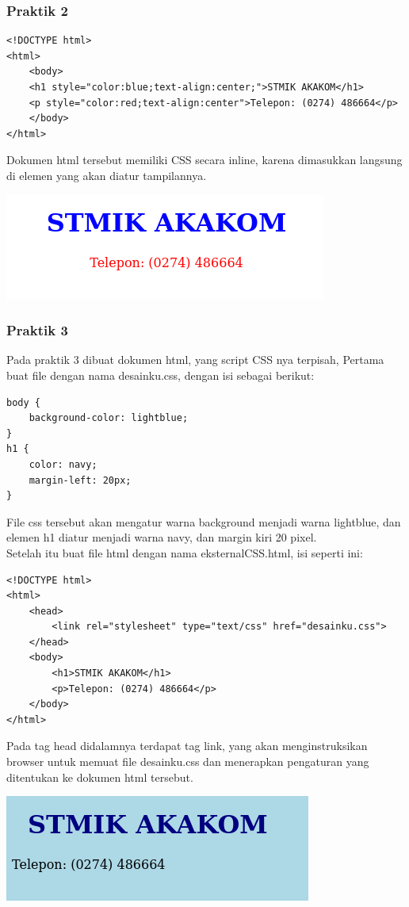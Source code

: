 \documentclass[a4paper,12pt]{article}
\begin{document}
\subsubsection{Praktik 2}
\begin{lstlisting}
<!DOCTYPE html>
<html>
    <body>
    <h1 style="color:blue;text-align:center;">STMIK AKAKOM</h1>
    <p style="color:red;text-align:center">Telepon: (0274) 486664</p>
    </body>
</html>
\end{lstlisting}

Dokumen html tersebut memiliki CSS secara inline, karena dimasukkan langsung di elemen yang
akan diatur tampilannya.
\begin{center}
    \includegraphics[width=\linewidth]{2.png}
\end{center}

\subsubsection{Praktik 3}
Pada praktik 3 dibuat dokumen html, yang script CSS nya terpisah, Pertama buat file dengan nama desainku.css, dengan isi sebagai berikut:
\begin{lstlisting}
body {
    background-color: lightblue;
}
h1 {
    color: navy;
    margin-left: 20px;
}
\end{lstlisting}
File css tersebut akan mengatur warna background menjadi warna lightblue, dan elemen h1 diatur menjadi warna navy, dan margin kiri 20 pixel.\\
Setelah itu buat file html dengan nama eksternalCSS.html, isi seperti ini:
\begin{lstlisting}
<!DOCTYPE html>
<html>
    <head>
        <link rel="stylesheet" type="text/css" href="desainku.css">
    </head>
    <body>
        <h1>STMIK AKAKOM</h1>
        <p>Telepon: (0274) 486664</p>
    </body>
</html>
\end{lstlisting}
Pada tag head didalamnya terdapat tag link, yang akan menginstruksikan browser untuk memuat file desainku.css dan menerapkan pengaturan yang ditentukan ke dokumen html tersebut.
\begin{center}
    \includegraphics[width=\linewidth]{3.png}
\end{center}
\end{document}
